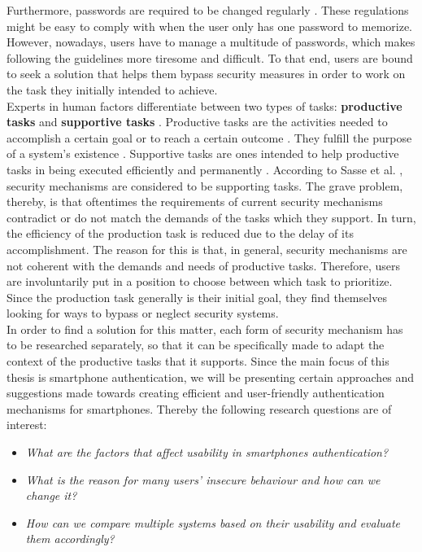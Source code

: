 Furthermore, passwords are required to be changed regularly \cite{adams2,gorman}. These regulations might be easy to comply with when the user only has one password to memorize. However, nowadays, users have to manage a multitude of passwords, which makes following the guidelines more tiresome and difficult. To that end, users are bound to seek a solution that helps them bypass security measures in order to work on the task they initially intended to achieve.\\

Experts in human factors differentiate between two types of tasks: \textbf{productive tasks} and \textbf{supportive tasks} \cite{sasse}. Productive tasks are the activities needed to accomplish a certain goal or to reach a certain outcome \cite{sasse}. They fulfill the purpose of a system's existence \cite{sasse}. Supportive tasks are ones intended to help productive tasks in being executed efficiently and permanently \cite{sasse}. According to Sasse et al. \cite{sasse}, security mechanisms are considered to be supporting tasks. The grave problem, thereby, is that oftentimes the requirements of current security mechanisms contradict or do not match the demands of the tasks which they support. In turn, the efficiency of the production task is reduced due to the delay of its accomplishment. The reason for this is that, in general, security mechanisms are not coherent with the demands and needs of productive tasks. Therefore, users are involuntarily put in a position to choose between which task to prioritize. Since the production task generally is their initial goal, they find themselves looking for ways to bypass or neglect security systems.\\

In order to find a solution for this matter, each form of security mechanism has to be researched separately, so that it can be specifically made to adapt the context of the productive tasks that it supports. Since the main focus of this thesis is smartphone authentication, we will be presenting certain approaches and suggestions made towards creating efficient and user-friendly authentication mechanisms for smartphones. Thereby the following research questions are of interest: 

\begin{itemize}
    \item \textit{What are the factors that affect usability in smartphones authentication?}
\item \textit{What is the reason for many users' insecure behaviour and how can we change it?} 
    \item \textit{How can we compare multiple systems based on their usability and evaluate them accordingly?}
\end{itemize}

